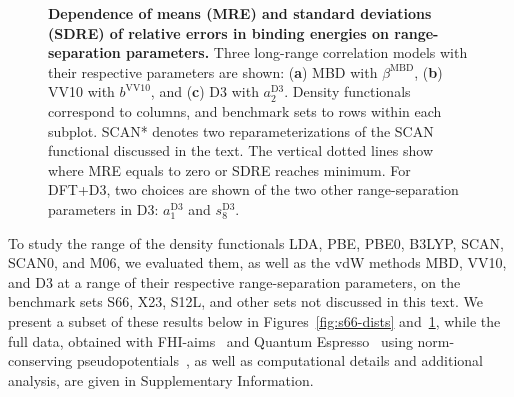 \begin{figure}
{
}
\caption{\textbf{Dependence of means (MRE) and standard deviations (SDRE) of relative errors in binding energies on range-separation parameters.}
Three long-range correlation models with their respective parameters are shown: (\textbf a) MBD with $\beta^\text{MBD}$, (\textbf b) VV10 with $b^\text{VV10}$, and (\textbf c) D3 with $a_2^\text{D3}$.
Density functionals correspond to columns, and benchmark sets to rows within each subplot.
SCAN* denotes two reparameterizations of the SCAN functional discussed in the text. %
The vertical dotted lines show where MRE equals to zero or SDRE reaches minimum.
For DFT+D3, two choices are shown of the two other range-separation parameters in D3: $a_1^\text{D3}$ and $s_8^\text{D3}$.
}\label{fig:param-fitting}
\end{figure}

To study the range of the density functionals LDA, PBE, PBE0, B3LYP, SCAN, SCAN0, and M06, we evaluated them, as well as the vdW methods MBD, VV10, and D3 at a range of their respective range-separation parameters, on the benchmark sets S66, X23, S12L, and other sets not discussed in this text.
We present a subset of these results below in Figures~\ref{fig:s66-dists} and~\ref{fig:param-fitting}, while the full data, obtained with FHI-aims~\cite{BlumCPC09} and Quantum Espresso~\cite{GiannozziJPCM09} using norm-conserving pseudopotentials~\cite{HamannPRB13}, as well as computational details and additional analysis, are given in Supplementary Information.

